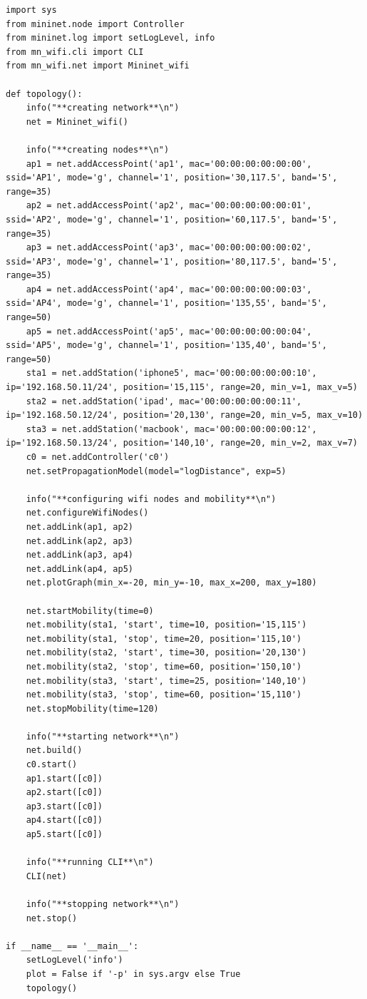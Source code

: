 \documentclass{article}
\begin{document}
\begin{lstlisting}
import sys
from mininet.node import Controller
from mininet.log import setLogLevel, info
from mn_wifi.cli import CLI
from mn_wifi.net import Mininet_wifi

def topology():
    info("**creating network**\n")
    net = Mininet_wifi()

    info("**creating nodes**\n")
    ap1 = net.addAccessPoint('ap1', mac='00:00:00:00:00:00', ssid='AP1', mode='g', channel='1', position='30,117.5', band='5', range=35)
    ap2 = net.addAccessPoint('ap2', mac='00:00:00:00:00:01', ssid='AP2', mode='g', channel='1', position='60,117.5', band='5', range=35)
    ap3 = net.addAccessPoint('ap3', mac='00:00:00:00:00:02', ssid='AP3', mode='g', channel='1', position='80,117.5', band='5', range=35)
    ap4 = net.addAccessPoint('ap4', mac='00:00:00:00:00:03', ssid='AP4', mode='g', channel='1', position='135,55', band='5', range=50)
    ap5 = net.addAccessPoint('ap5', mac='00:00:00:00:00:04', ssid='AP5', mode='g', channel='1', position='135,40', band='5', range=50)
    sta1 = net.addStation('iphone5', mac='00:00:00:00:00:10', ip='192.168.50.11/24', position='15,115', range=20, min_v=1, max_v=5)
    sta2 = net.addStation('ipad', mac='00:00:00:00:00:11', ip='192.168.50.12/24', position='20,130', range=20, min_v=5, max_v=10)
    sta3 = net.addStation('macbook', mac='00:00:00:00:00:12', ip='192.168.50.13/24', position='140,10', range=20, min_v=2, max_v=7)
    c0 = net.addController('c0')
    net.setPropagationModel(model="logDistance", exp=5)

    info("**configuring wifi nodes and mobility**\n")
    net.configureWifiNodes()
    net.addLink(ap1, ap2)
    net.addLink(ap2, ap3)
    net.addLink(ap3, ap4)
    net.addLink(ap4, ap5)
    net.plotGraph(min_x=-20, min_y=-10, max_x=200, max_y=180)

    net.startMobility(time=0)
    net.mobility(sta1, 'start', time=10, position='15,115')
    net.mobility(sta1, 'stop', time=20, position='115,10')
    net.mobility(sta2, 'start', time=30, position='20,130')
    net.mobility(sta2, 'stop', time=60, position='150,10')
    net.mobility(sta3, 'start', time=25, position='140,10')
    net.mobility(sta3, 'stop', time=60, position='15,110')
    net.stopMobility(time=120)

    info("**starting network**\n")
    net.build()
    c0.start()
    ap1.start([c0])
    ap2.start([c0])
    ap3.start([c0])
    ap4.start([c0])
    ap5.start([c0])

    info("**running CLI**\n")
    CLI(net)

    info("**stopping network**\n")
    net.stop()

if __name__ == '__main__':
    setLogLevel('info')
    plot = False if '-p' in sys.argv else True
    topology()
\end{lstlisting}
\end{document}
